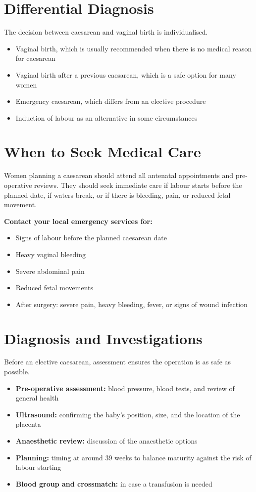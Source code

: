 \section*{Differential Diagnosis}
The decision between caesarean and vaginal birth is individualised.
\begin{itemize}
    \item Vaginal birth, which is usually recommended when there is no medical reason for caesarean
    \item Vaginal birth after a previous caesarean, which is a safe option for many women
    \item Emergency caesarean, which differs from an elective procedure
    \item Induction of labour as an alternative in some circumstances
\end{itemize}

\section*{When to Seek Medical Care}
Women planning a caesarean should attend all antenatal appointments and pre-operative reviews. They should seek immediate care if labour starts before the planned date, if waters break, or if there is bleeding, pain, or reduced fetal movement.

\textbf{Contact your local emergency services for:}
\begin{itemize}
    \item Signs of labour before the planned caesarean date
    \item Heavy vaginal bleeding
    \item Severe abdominal pain
    \item Reduced fetal movements
    \item After surgery: severe pain, heavy bleeding, fever, or signs of wound infection
\end{itemize}

\section*{Diagnosis and Investigations}
Before an elective caesarean, assessment ensures the operation is as safe as possible.
\begin{itemize}
    \item \textbf{Pre-operative assessment:} blood pressure, blood tests, and review of general health
    \item \textbf{Ultrasound:} confirming the baby's position, size, and the location of the placenta
    \item \textbf{Anaesthetic review:} discussion of the anaesthetic options
    \item \textbf{Planning:} timing at around 39 weeks to balance maturity against the risk of labour starting
    \item \textbf{Blood group and crossmatch:} in case a transfusion is needed
\end{itemize}

